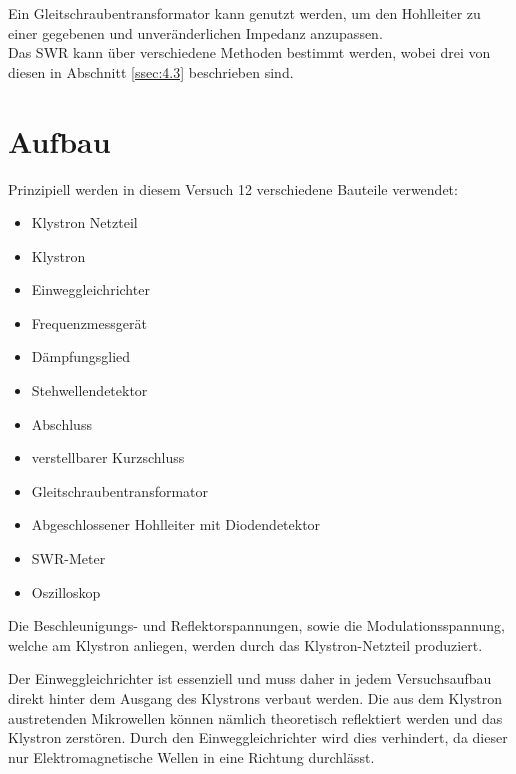             Ein Gleitschraubentransformator kann genutzt werden, um den Hohlleiter zu einer gegebenen und unveränderlichen Impedanz anzupassen.\\
            Das SWR kann über verschiedene Methoden bestimmt werden, wobei drei von diesen in Abschnitt \ref{ssec:4.3} beschrieben sind.

%
%
    \section{Aufbau}
        Prinzipiell werden in diesem Versuch 12 verschiedene Bauteile verwendet:
        \begin{itemize}
            \item Klystron Netzteil
            \item Klystron
            \item Einweggleichrichter
            \item Frequenzmessgerät
            \item Dämpfungsglied
            \item Stehwellendetektor
            \item Abschluss
            \item verstellbarer Kurzschluss
            \item Gleitschraubentransformator
            \item Abgeschlossener Hohlleiter mit Diodendetektor
            \item SWR-Meter
            \item Oszilloskop
        \end{itemize}

        Die Beschleunigungs- und Reflektorspannungen, sowie die Modulationsspannung, welche am Klystron anliegen, werden durch das Klystron-Netzteil produziert.

        Der Einweggleichrichter ist essenziell und muss daher in jedem Versuchsaufbau direkt hinter dem Ausgang des Klystrons verbaut werden.
        Die aus dem Klystron austretenden Mikrowellen können nämlich theoretisch reflektiert werden und das Klystron zerstören.
        Durch den Einweggleichrichter wird dies verhindert, da dieser nur Elektromagnetische Wellen in eine Richtung durchlässt.

